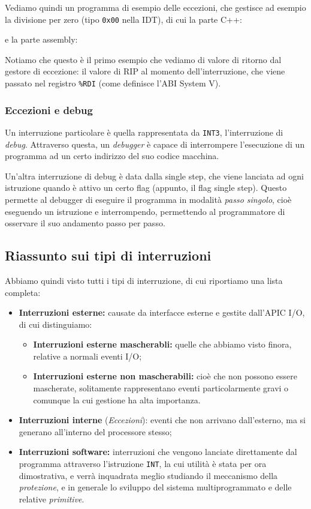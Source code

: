 \documentclass[a4paper,11pt]{article}
\begin{document}
\par\medskip

Vediamo quindi un programma di esempio delle eccezioni, che gestisce ad esempio la divisione per zero (tipo \lstinline|0x00| nella IDT), di cui la parte C++:
\lstset{style=codestyle, language=C++}

e la parte assembly:
\lstset{style=codestyle, language=assembler}


Notiamo che questo è il primo esempio che vediamo di valore di ritorno dal gestore di eccezione: il valore di RIP al momento dell'interruzione, che viene passato nel registro \lstinline|%RDI| (come definisce l'ABI System V).

\subsubsection{Eccezioni e debug}
Un interruzione particolare è quella rappresentata da \lstinline|INT3|, l'interruzione di \textit{debug}.
Attraverso questa, un \textit{debugger} è capace di interrompere l'esecuzione di un programma ad un certo indirizzo del suo codice macchina.

Un'altra interruzione di debug è data dalla single step, che viene lanciata ad ogni istruzione quando è attivo un certo flag (appunto, il flag single step). Questo permette al debugger di eseguire il programma in modalità \textit{passo singolo}, cioè eseguendo un istruzione e interrompendo, permettendo al programmatore di osservare il suo andamento passo per passo.

\subsection{Riassunto sui tipi di interruzioni}
Abbiamo quindi visto tutti i tipi di interruzione, di cui riportiamo una lista completa:
\begin{itemize}
	\item \textbf{Interruzioni esterne:} causate da interfacce esterne e gestite dall'APIC I/O, di cui distinguiamo:
		\begin{itemize}
			\item \textbf{Interruzioni esterne mascherabli:} quelle che abbiamo visto finora, relative a normali eventi I/O;
			\item \textbf{Interruzioni esterne non mascherabili:} cioè che non possono essere mascherate, solitamente rappresentano eventi particolarmente gravi o comunque la cui gestione ha alta importanza.
		\end{itemize}
	\item \textbf{Interruzioni interne} (\textit{Eccezioni}): eventi che non arrivano dall'esterno, ma si generano all'interno del processore stesso;
	\item \textbf{Interruzioni software:} interruzioni che vengono lanciate direttamente dal programma attraverso l'istruzione \lstinline|INT|, la cui utilità è stata per ora dimostrativa, e verrà inquadrata meglio studiando il meccanismo della \textit{protezione}, e in generale lo sviluppo del sistema multiprogrammato e delle relative \textit{primitive}.
\end{itemize}
\end{document}
